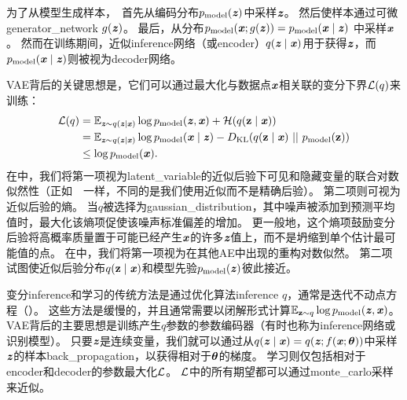 为了从模型生成样本，~首先从编码分布$p_{\text{model}}(\Vz)$中采样$\Vz$。
然后使样本通过可微\gls{generator_network} $g(\Vz)$。
最后，从分布$p_{\text{model}}(\Vx;g(\Vz)) = p_{\text{model}}(\Vx  \mid  \Vz)$ 中采样$\Vx$。
然而在训练期间，近似\gls{inference}网络（或\gls{encoder}）$q(\Vz  \mid  \Vx)$用于获得$\Vz$，而$p_{\text{model}}(\Vx  \mid  \Vz)$则被视为\gls{decoder}网络。


\gls{VAE}背后的关键思想是，它们可以通过最大化与数据点$\Vx$相关联的变分下界$\CalL(q)$来训练：
\begin{align}
\CalL(q) &= \SetE_{\Vz \sim q(\Vz  \mid  \Vx)} \log p_{\text{model}} (\Vz, \Vx)
+ \CalH(q(\RVz  \mid  \Vx)) \label{eq:var_lower}  \\
&= \SetE_{\Vz \sim q(\Vz  \mid  \Vx)} \log p_{\text{model}} (\Vx  \mid  \Vz)
- D_{\text{KL}}(q(\RVz  \mid  \Vx) ~||~ p_{\text{model}}(\RVz)) \label{eq:var_kl} \\
& \leq \log p_{\text{model}}(\Vx).
\end{align}
在中，我们将第一项视为\gls{latent_variable}的近似后验下可见和隐藏变量的联合对数似然性（正如~~一样，不同的是我们使用近似而不是精确后验）。
第二项则可视为近似后验的熵。
当$q$被选择为\gls{gaussian_distribution}，其中噪声被添加到预测平均值时，最大化该熵项促使该噪声标准偏差的增加。
更一般地，这个熵项鼓励变分后验将高概率质量置于可能已经产生$\Vx$的许多$\Vz$值上，而不是坍缩到单个估计最可能值的点。
在中，我们将第一项视为在其他\gls{AE}中出现的重构对数似然。
第二项试图使近似后验分布$q(\RVz  \mid  \Vx)$和模型先验$p_{\text{model}}(\Vz)$彼此接近。


变分\gls{inference}和学习的传统方法是通过优化算法\gls{inference} $q$，通常是迭代不动点方程（）。
这些方法是缓慢的，并且通常需要以闭解形式计算$\SetE_{\RVz \sim q} \log p_{\text{model}} (\Vz, \Vx)$。 %
\gls{VAE}背后的主要思想是训练产生$q$参数的参数编码器（有时也称为\gls{inference}网络或识别模型）。
只要$\Vz$是连续变量，我们就可以通过从$q(\Vz  \mid  \Vx) = q(\Vz; f(\Vx; \Vtheta))$中采样$\Vz$的样本\gls{back_propagation}，以获得相对于$\Vtheta$的梯度。
学习则仅包括相对于\gls{encoder}和\gls{decoder}的参数最大化$\CalL$。
$\CalL$中的所有期望都可以通过\gls{monte_carlo}采样来近似。


